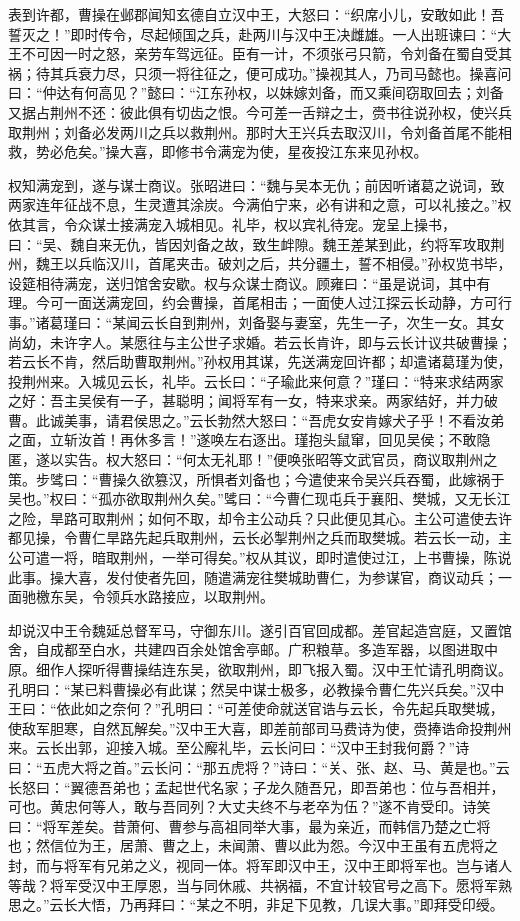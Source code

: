 表到许都，曹操在邺郡闻知玄德自立汉中王，大怒曰：“织席小儿，安敢如此！吾誓灭之！”即时传令，尽起倾国之兵，赴两川与汉中王决雌雄。一人出班谏曰：“大王不可因一时之怒，亲劳车驾远征。臣有一计，不须张弓只箭，令刘备在蜀自受其祸；待其兵衰力尽，只须一将往征之，便可成功。”操视其人，乃司马懿也。操喜问曰：“仲达有何高见？”懿曰：“江东孙权，以妹嫁刘备，而又乘间窃取回去；刘备又据占荆州不还：彼此俱有切齿之恨。今可差一舌辩之士，赍书往说孙权，使兴兵取荆州；刘备必发两川之兵以救荆州。那时大王兴兵去取汉川，令刘备首尾不能相救，势必危矣。”操大喜，即修书令满宠为使，星夜投江东来见孙权。

权知满宠到，遂与谋士商议。张昭进曰：“魏与吴本无仇；前因听诸葛之说词，致两家连年征战不息，生灵遭其涂炭。今满伯宁来，必有讲和之意，可以礼接之。”权依其言，令众谋士接满宠入城相见。礼毕，权以宾礼待宠。宠呈上操书，曰：“吴、魏自来无仇，皆因刘备之故，致生衅隙。魏王差某到此，约将军攻取荆州，魏王以兵临汉川，首尾夹击。破刘之后，共分疆土，誓不相侵。”孙权览书毕，设筵相待满宠，送归馆舍安歇。权与众谋士商议。顾雍曰：“虽是说词，其中有理。今可一面送满宠回，约会曹操，首尾相击；一面使人过江探云长动静，方可行事。”诸葛瑾曰：“某闻云长自到荆州，刘备娶与妻室，先生一子，次生一女。其女尚幼，未许字人。某愿往与主公世子求婚。若云长肯许，即与云长计议共破曹操；若云长不肯，然后助曹取荆州。”孙权用其谋，先送满宠回许都；却遣诸葛瑾为使，投荆州来。入城见云长，礼毕。云长曰：“子瑜此来何意？”瑾曰：“特来求结两家之好：吾主吴侯有一子，甚聪明；闻将军有一女，特来求亲。两家结好，并力破曹。此诚美事，请君侯思之。”云长勃然大怒曰：“吾虎女安肯嫁犬子乎！不看汝弟之面，立斩汝首！再休多言！”遂唤左右逐出。瑾抱头鼠窜，回见吴侯；不敢隐匿，遂以实告。权大怒曰：“何太无礼耶！”便唤张昭等文武官员，商议取荆州之策。步骘曰：“曹操久欲篡汉，所惧者刘备也；今遣使来令吴兴兵吞蜀，此嫁祸于吴也。”权曰：“孤亦欲取荆州久矣。”骘曰：“今曹仁现屯兵于襄阳、樊城，又无长江之险，旱路可取荆州；如何不取，却令主公动兵？只此便见其心。主公可遣使去许都见操，令曹仁旱路先起兵取荆州，云长必掣荆州之兵而取樊城。若云长一动，主公可遣一将，暗取荆州，一举可得矣。”权从其议，即时遣使过江，上书曹操，陈说此事。操大喜，发付使者先回，随遣满宠往樊城助曹仁，为参谋官，商议动兵；一面驰檄东吴，令领兵水路接应，以取荆州。

却说汉中王令魏延总督军马，守御东川。遂引百官回成都。差官起造宫庭，又置馆舍，自成都至白水，共建四百余处馆舍亭邮。广积粮草。多造军器，以图进取中原。细作人探听得曹操结连东吴，欲取荆州，即飞报入蜀。汉中王忙请孔明商议。孔明曰：“某已料曹操必有此谋；然吴中谋士极多，必教操令曹仁先兴兵矣。”汉中王曰：“依此如之奈何？”孔明曰：“可差使命就送官诰与云长，令先起兵取樊城，使敌军胆寒，自然瓦解矣。”汉中王大喜，即差前部司马费诗为使，赍捧诰命投荆州来。云长出郭，迎接入城。至公廨礼毕，云长问曰：“汉中王封我何爵？”诗曰：“五虎大将之首。”云长问：“那五虎将？”诗曰：“关、张、赵、马、黄是也。”云长怒曰：“翼德吾弟也；孟起世代名家；子龙久随吾兄，即吾弟也：位与吾相并，可也。黄忠何等人，敢与吾同列？大丈夫终不与老卒为伍？”遂不肯受印。诗笑曰：“将军差矣。昔萧何、曹参与高祖同举大事，最为亲近，而韩信乃楚之亡将也；然信位为王，居萧、曹之上，未闻萧、曹以此为怨。今汉中王虽有五虎将之封，而与将军有兄弟之义，视同一体。将军即汉中王，汉中王即将军也。岂与诸人等哉？将军受汉中王厚恩，当与同休戚、共祸福，不宜计较官号之高下。愿将军熟思之。”云长大悟，乃再拜曰：“某之不明，非足下见教，几误大事。”即拜受印绶。

